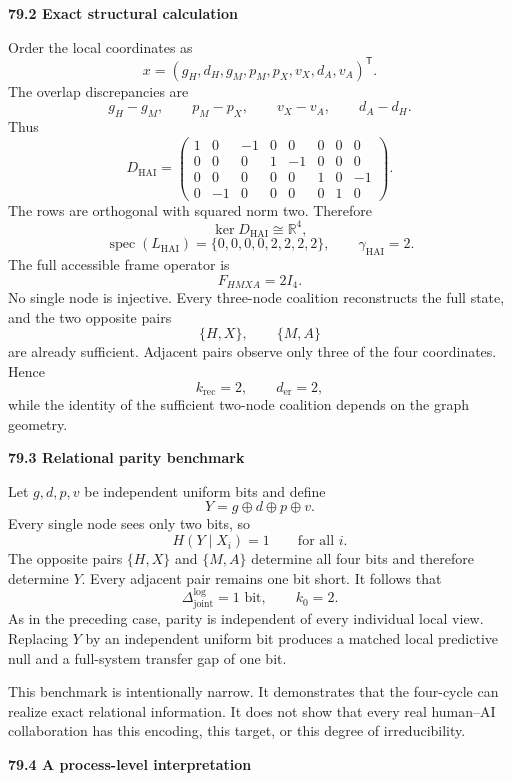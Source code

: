 \documentclass[11pt,letterpaper]{article}
\DeclareMathOperator{\spec}{spec}
\newcommand{\subtopic}[1]{%
 \vspace{0.45em}
 {\bfseries\color{AccentColor} #1\par}
}
\theoremstyle{plain}
\theoremstyle{definition}
\begin{document}
\subtopic{79.2 Exact structural calculation}

Order the local coordinates as
\[
x=(g_H,d_H,g_M,p_M,p_X,v_X,d_A,v_A)^{\mathsf T}.
\]
The overlap discrepancies are
\[
g_H-g_M,
\qquad
p_M-p_X,
\qquad
v_X-v_A,
\qquad
d_A-d_H.
\]
Thus
\[
D_{\mathrm{HAI}}
=
\begin{pmatrix}
1&0&-1&0&0&0&0&0\\
0&0&0&1&-1&0&0&0\\
0&0&0&0&0&1&0&-1\\
0&-1&0&0&0&0&1&0
\end{pmatrix}.
\]
The rows are orthogonal with squared norm two. Therefore
\[
\ker D_{\mathrm{HAI}}
\cong\mathbb R^4,
\]
\[
\boxed{
\spec(L_{\mathrm{HAI}})
=
\{0,0,0,0,2,2,2,2\},
\qquad
\gamma_{\mathrm{HAI}}=2.
}
\]
The full accessible frame operator is
\[
F_{HMXA}=2I_4.
\]
No single node is injective. Every three-node coalition reconstructs the full
state, and the two opposite pairs
\[
\{H,X\},
\qquad
\{M,A\}
\]
are already sufficient. Adjacent pairs observe only three of the four
coordinates. Hence
\[
k_{\mathrm{rec}}=2,
\qquad
d_{\mathrm{er}}=2,
\]
while the identity of the sufficient two-node coalition depends on the graph
geometry.

\subtopic{79.3 Relational parity benchmark}

Let \(g,d,p,v\) be independent uniform bits and define
\[
Y=g\oplus d\oplus p\oplus v.
\]
Every single node sees only two bits, so
\[
H(Y\mid X_i)=1
\qquad\text{for all }i.
\]
The opposite pairs \(\{H,X\}\) and \(\{M,A\}\) determine all four bits and
therefore determine \(Y\). Every adjacent pair remains one bit short. It
follows that
\[
\boxed{
\Delta_{\mathrm{joint}}^{\log}=1\text{ bit},
\qquad
k_0=2.
}
\]
As in the preceding case, parity is independent of every individual local
view. Replacing \(Y\) by an independent uniform bit produces a matched local
predictive null and a full-system transfer gap of one bit.

This benchmark is intentionally narrow. It demonstrates that the four-cycle
can realize exact relational information. It does not show that every real
human--AI collaboration has this encoding, this target, or this degree of
irreducibility.

\subtopic{79.4 A process-level interpretation}
\end{document}
